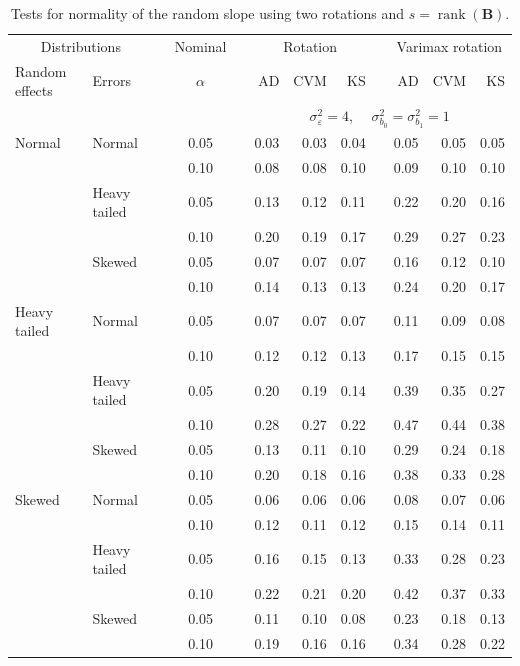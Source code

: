 \documentclass[12pt]{article} %
\DeclareMathOperator{\rank}{rank}
\begin{document}
\begin{table}[ht]
\caption{Tests for normality of the random slope using two rotations and $s = \rank(\bm{B})$.}
\begin{scriptsize}
\begin{center}
\begin{tabular}{ll p{.1cm} c p{.1cm} rrr p{.1cm} rrr}
  \hline
  \multicolumn{2}{c}{Distributions}& & Nominal & &  \multicolumn{3}{c}{Rotation} & & \multicolumn{3}{c}{Varimax rotation} \\ \cline{1-2} \cline{6-8} \cline{10-12}   
  Random effects & Errors & & $\alpha$ & & AD & CVM & KS & & AD & CVM & KS \\ 
   \hline
& && && \multicolumn{7}{c}{$\sigma_{\varepsilon}^2 = 4$, \ \ $\sigma_{b_0}^2 = \sigma_{b_1}^2 = 1$} \\ \cline{6-12}
Normal       & Normal       && 0.05 &&  0.03 & 0.03 & 0.04 && 0.05 & 0.05 & 0.05 \\ 
             &              && 0.10 &&  0.08 & 0.08 & 0.10 && 0.09 & 0.10 & 0.10 \\ 
             & Heavy tailed && 0.05 &&  0.13 & 0.12 & 0.11 && 0.22 & 0.20 & 0.16 \\ 
             &              && 0.10 &&  0.20 & 0.19 & 0.17 && 0.29 & 0.27 & 0.23 \\ 
             & Skewed       && 0.05 &&  0.07 & 0.07 & 0.07 && 0.16 & 0.12 & 0.10 \\ 
             &              && 0.10 &&  0.14 & 0.13 & 0.13 && 0.24 & 0.20 & 0.17 \\ 
Heavy tailed & Normal       && 0.05 &&  0.07 & 0.07 & 0.07 && 0.11 & 0.09 & 0.08 \\ 
             &              && 0.10 &&  0.12 & 0.12 & 0.13 && 0.17 & 0.15 & 0.15 \\ 
             & Heavy tailed && 0.05 &&  0.20 & 0.19 & 0.14 && 0.39 & 0.35 & 0.27 \\ 
             &              && 0.10 &&  0.28 & 0.27 & 0.22 && 0.47 & 0.44 & 0.38 \\ 
             & Skewed       && 0.05 &&  0.13 & 0.11 & 0.10 && 0.29 & 0.24 & 0.18 \\ 
             &              && 0.10 &&  0.20 & 0.18 & 0.16 && 0.38 & 0.33 & 0.28 \\ 
Skewed       & Normal       && 0.05 &&  0.06 & 0.06 & 0.06 && 0.08 & 0.07 & 0.06 \\ 
             &              && 0.10 &&  0.12 & 0.11 & 0.12 && 0.15 & 0.14 & 0.11 \\ 
             & Heavy tailed && 0.05 &&  0.16 & 0.15 & 0.13 && 0.33 & 0.28 & 0.23 \\ 
             &              && 0.10 &&  0.22 & 0.21 & 0.20 && 0.42 & 0.37 & 0.33 \\ 
             & Skewed       && 0.05 &&  0.11 & 0.10 & 0.08 && 0.23 & 0.18 & 0.13 \\ 
             &              && 0.10 &&  0.19 & 0.16 & 0.16 && 0.34 & 0.28 & 0.22 \\ 


\end{tabular}
\end{center}
\end{scriptsize}
\end{table}
\end{document}
